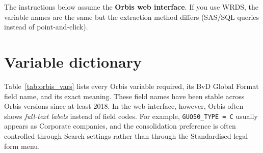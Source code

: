\documentclass[11pt,a4paper]{article}
\newcommand{\field}[1]{\texttt{#1}}
\newcommand{\menu}[1]{\textsf{#1}}
\begin{document}
The instructions below assume the \textbf{Orbis web interface}. If you use WRDS, the variable names are the same but the extraction method differs (SAS/SQL queries instead of point-and-click).

\section{Variable dictionary}\label{sec:variables}

Table~\ref{tab:orbis_vars} lists every Orbis variable required, its BvD Global Format field name, and its exact meaning. These field names have been stable across Orbis versions since at least 2018. In the web interface, however, Orbis often shows \emph{full-text labels} instead of field codes. For example, \field{GUO50\_TYPE = C} usually appears as \menu{Corporate companies}, and the consolidation preference is often controlled through \menu{Search settings} rather than through the \menu{Standardised legal form} menu.
\end{document}
